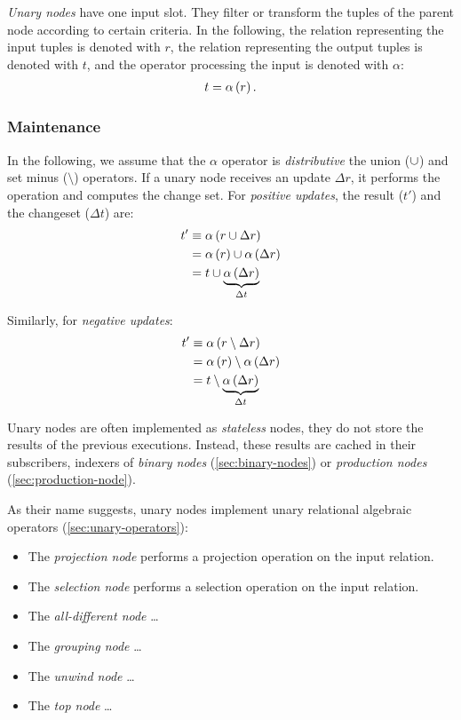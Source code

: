 
\emph{Unary nodes} have one input slot. They filter or transform the tuples of the parent node according to certain criteria. In the following, the relation representing the input tuples is denoted with $r$, the relation representing the output tuples is denoted with $t$, and the operator processing the input is denoted with $\alpha$:
\begin{align*}
t = \mathrm{\alpha}\left(r\right).
\end{align*}

\subsubsection{Maintenance}

In the following, we assume that the $\alpha$ operator is \emph{distributive} \wrt the union ($\cup$) and set minus ($\setminus$) operators. If a unary node receives an update $\Delta r$, it performs the operation and computes the change set. For \emph{positive updates}, the result ($t'$) and the changeset ($\Delta t$) are:
\begin{align*}
	t'       & \equiv \mathrm{\alpha}\left(r \cup \Delta r\right) \\
			 & = \mathrm{\alpha}\left(r\right) \cup \mathrm{\alpha}\left(\Delta r\right) \\
			 & = t \cup \underbrace{\mathrm{\alpha}\left(\Delta r\right)}_{\Delta t} \\
\end{align*}

Similarly, for \emph{negative updates}:
\begin{align*}
	t'       & \equiv \mathrm{\alpha}\left(r \setminus \Delta r\right) \\
			 & = \mathrm{\alpha}\left(r\right) \setminus \mathrm{\alpha}\left(\Delta r\right) \\
			 & = t \setminus \underbrace{\mathrm{\alpha}\left(\Delta r\right)}_{\Delta t}
\end{align*}

Unary nodes are often implemented as \emph{stateless} nodes, \ie they do not store the results of the previous executions. Instead, these results are cached in their subscribers, \eg indexers of \emph{binary nodes} (\autoref{sec:binary-nodes}) or \emph{production nodes} (\autoref{sec:production-node}).

As their name suggests, unary nodes implement unary relational algebraic operators (\autoref{sec:unary-operators}):

\begin{itemize}
	\item The \emph{projection node} performs a projection operation on the input relation.
	\item The \emph{selection node} performs a selection operation on the input relation.
	\item The \emph{all-different node} \ldots
	\item The \emph{grouping node} \ldots
	\item The \emph{unwind node} \ldots
	\item The \emph{top node} \ldots
\end{itemize}

